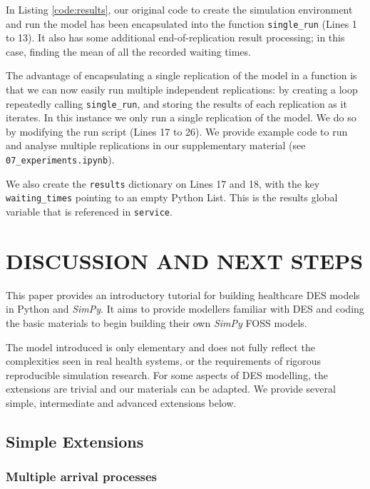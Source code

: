 \documentclass{swpaperproc}
\theoremstyle{sw}
\begin{document}
In Listing \ref{code:results}, our original code to create the simulation environment and run the model has been encapsulated into the function \verb|single_run| (Lines 1 to 13). It also has some additional end-of-replication result processing; in this case, finding the mean of all the recorded waiting times.

The advantage of encapsulating a single replication of the model in a function is that we can now easily run multiple independent replications: by creating a loop repeatedly calling \verb|single_run|, and storing the results of each replication as it iterates. In this instance we only run a single replication of the model. We do so by modifying the run script (Lines 17 to 26).  We provide example code to run and analyse multiple replications in our supplementary material (see \verb|07_experiments.ipynb|).

We also create the \verb|results| dictionary on Lines 17 and 18, with the key \verb|waiting_times| pointing to an empty Python List.  This is the results global variable that is referenced in \verb|service|.



\section{DISCUSSION AND NEXT STEPS}
\label{sec:discussion}

This paper provides an introductory tutorial for building healthcare DES models in Python and \textit{SimPy}. It aims to provide modellers familiar with DES and coding the basic materials to begin building their own \textit{SimPy} FOSS models. 

The model introduced is only elementary and does not fully reflect the complexities seen in real health systems, or the requirements of rigorous reproducible simulation research. For some aspects of DES modelling, the extensions are trivial and our materials can be adapted. We provide several simple, intermediate and advanced extensions below.

\subsection{Simple Extensions}

\subsubsection{Multiple arrival processes}
\end{document}
